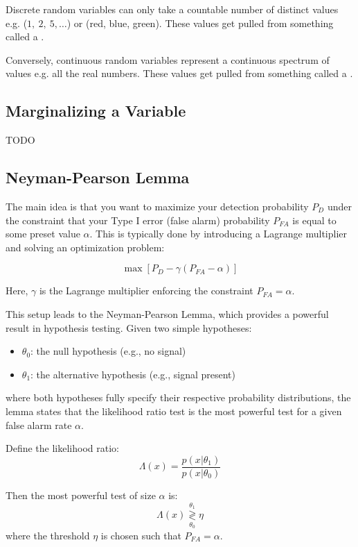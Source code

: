 Discrete random variables can only take a countable number of distinct values e.g. ($1,~2, ~5,\ldots$) or (red, blue, green). These values get pulled from something called a .

Conversely, continuous random variables represent a continuous spectrum of values e.g. all the real numbers. These values get pulled from something called a .

\subsection{Marginalizing a Variable}
TODO

\subsection{Neyman-Pearson Lemma}

The main idea is that you want to maximize your detection probability $P_D$ under the constraint that your Type I error (false alarm) probability $P_{FA}$ is equal to some preset value $\alpha$. This is typically done by introducing a Lagrange multiplier and solving an optimization problem:

\begin{equation}
	\max \left[ P_D - \gamma (P_{FA} - \alpha) \right]
\end{equation}

Here, $\gamma$ is the Lagrange multiplier enforcing the constraint $P_{FA} = \alpha$.

This setup leads to the Neyman-Pearson Lemma, which provides a powerful result in hypothesis testing. Given two simple hypotheses:
\begin{itemize}
	\item $\theta_0$: the null hypothesis (e.g., no signal)
	\item $\theta_1$: the alternative hypothesis (e.g., signal present)
\end{itemize}
where both hypotheses fully specify their respective probability distributions, the lemma states that the likelihood ratio test is the most powerful test for a given false alarm rate $\alpha$.

Define the likelihood ratio:
\begin{equation}
	\Lambda(x) = \frac{p(x | \theta_1)}{p(x | \theta_0)}
\end{equation}

Then the most powerful test of size $\alpha$ is:
\[
\Lambda(x) \underset{\theta_0}{\overset{\theta_1}{\gtrless}} \eta
\]
where the threshold $\eta$ is chosen such that $P_{FA} = \alpha$.

